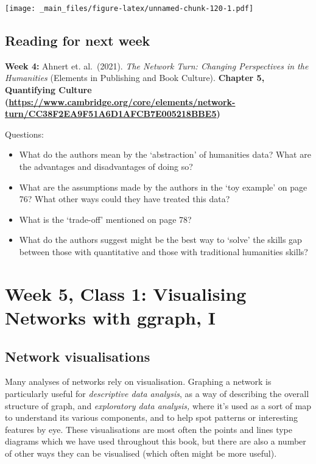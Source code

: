 \documentclass[
]{book}
\providecommand{\tightlist}{%
  \setlength{\itemsep}{0pt}\setlength{\parskip}{0pt}}
\begin{document}
\texttt{[image: \_main\_files/figure-latex/unnamed-chunk-120-1.pdf]}

\hypertarget{reading-for-next-week-1}{%
\section{Reading for next week}\label{reading-for-next-week-1}}

\textbf{Week 4:} Ahnert et. al.~(2021). \emph{The Network Turn: Changing Perspectives in the Humanities} (Elements in Publishing and Book Culture). \textbf{Chapter 5, \textquotesingle Quantifying Culture\textquotesingle{} (\url{https://www.cambridge.org/core/elements/network-turn/CC38F2EA9F51A6D1AFCB7E005218BBE5})}

Questions:

\begin{itemize}
\tightlist
\item
  What do the authors mean by the `abstraction' of humanities data? What are the advantages and disadvantages of doing so?
\item
  What are the assumptions made by the authors in the `toy example' on page 76? What other ways could they have treated this data?
\item
  What is the `trade-off' mentioned on page 78?
\item
  What do the authors suggest might be the best way to `solve' the skills gap between those with quantitative and those with traditional humanities skills?
\end{itemize}

\hypertarget{week-5-class-1-visualising-networks-with-ggraph-i}{%
\chapter{Week 5, Class 1: Visualising Networks with ggraph, I}\label{week-5-class-1-visualising-networks-with-ggraph-i}}

\hypertarget{network-visualisations}{%
\section{Network visualisations}\label{network-visualisations}}

Many analyses of networks rely on visualisation. Graphing a network is particularly useful for \emph{descriptive data analysis}, as a way of describing the overall structure of graph, and \emph{exploratory data analysis,} where it's used as a sort of map to understand its various components, and to help spot patterns or interesting features by eye. These visualisations are most often the points and lines type diagrams which we have used throughout this book, but there are also a number of other ways they can be visualised (which often might be more useful).
\end{document}
